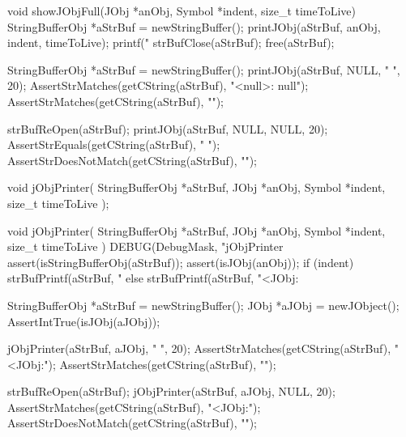 void showJObjFull(JObj *anObj, Symbol *indent, size_t timeToLive) {
  StringBufferObj *aStrBuf = newStringBuffer();
  printJObj(aStrBuf, anObj, indent, timeToLive);
  printf("%
  strBufClose(aStrBuf);
  free(aStrBuf);
}
\stopCCode


\startCTest
  StringBufferObj *aStrBuf = newStringBuffer();
  printJObj(aStrBuf, NULL, "  ", 20);
  AssertStrMatches(getCString(aStrBuf), "<null>: null");
  AssertStrMatches(getCString(aStrBuf), "\n");
  
  strBufReOpen(aStrBuf);
  printJObj(aStrBuf, NULL, NULL, 20);
  AssertStrEquals(getCString(aStrBuf), " ");
  AssertStrDoesNotMatch(getCString(aStrBuf), "\n");
\stopCTest
\stopTestCase
\stopTestSuite

\startTestSuite[jObjPrinter]

\startCHeader
void jObjPrinter(
  StringBufferObj *aStrBuf,
  JObj            *anObj,
  Symbol          *indent,
  size_t          timeToLive
);
\stopCHeader

\startCCode
void jObjPrinter(
  StringBufferObj *aStrBuf,
  JObj            *anObj,
  Symbol          *indent,
  size_t           timeToLive
) {
  DEBUG(DebugMask, "jObjPrinter %
  assert(isStringBufferObj(aStrBuf));
  assert(isJObj(anObj));
  if (indent) {
    strBufPrintf(aStrBuf, "%
  } else {
    strBufPrintf(aStrBuf, "<JObj:%
  }
}
\stopCCode


\startCTest
  StringBufferObj *aStrBuf = newStringBuffer();
  JObj *aJObj = newJObject();
  AssertIntTrue(isJObj(aJObj));
  
  jObjPrinter(aStrBuf, aJObj, "  ", 20);
  AssertStrMatches(getCString(aStrBuf), "<JObj:");
  AssertStrMatches(getCString(aStrBuf), "\n");

  strBufReOpen(aStrBuf);
  jObjPrinter(aStrBuf, aJObj, NULL, 20);
  AssertStrMatches(getCString(aStrBuf), "<JObj:");
  AssertStrDoesNotMatch(getCString(aStrBuf), "\n");
\stopCTest
\stopTestCase
\stopTestSuite